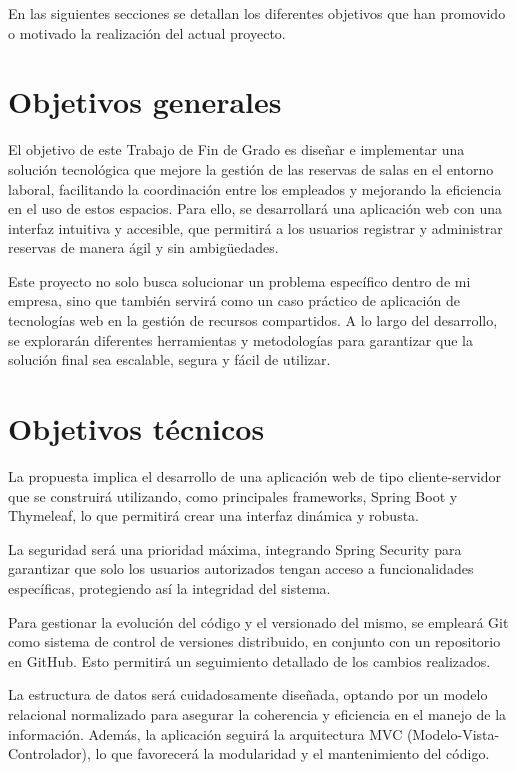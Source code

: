 
En las siguientes secciones se detallan los diferentes objetivos que han promovido o motivado la realización del actual proyecto.

\section{Objetivos generales}\label{objetivos-generales}
El objetivo de este Trabajo de Fin de Grado es diseñar e implementar una solución tecnológica que mejore la gestión de las reservas de salas en el entorno laboral, facilitando la coordinación entre los empleados y mejorando la eficiencia en el uso de estos espacios. Para ello, se desarrollará una aplicación web con una interfaz intuitiva y accesible, que permitirá a los usuarios registrar y administrar reservas de manera ágil y sin ambigüedades.

Este proyecto no solo busca solucionar un problema específico dentro de mi empresa, sino que también servirá como un caso práctico de aplicación de tecnologías web en la gestión de recursos compartidos. A lo largo del desarrollo, se explorarán diferentes herramientas y metodologías para garantizar que la solución final sea escalable, segura y fácil de utilizar.

\section{Objetivos técnicos}\label{objetivos-tecnicos}
La propuesta implica el desarrollo de una aplicación web de tipo cliente-servidor que se construirá utilizando, como principales frameworks, Spring Boot y Thymeleaf, lo que permitirá crear una interfaz dinámica y robusta.

La seguridad será una prioridad máxima, integrando Spring Security para garantizar que solo los usuarios autorizados tengan acceso a funcionalidades específicas, protegiendo así la integridad del sistema.

Para gestionar la evolución del código y el versionado del mismo, se empleará Git como sistema de control de versiones distribuido, en conjunto con un repositorio en GitHub. Esto permitirá un seguimiento detallado de los cambios realizados.

La estructura de datos será cuidadosamente diseñada, optando por un modelo relacional normalizado para asegurar la coherencia y eficiencia en el manejo de la información. Además, la aplicación seguirá la arquitectura MVC (Modelo-Vista-Controlador), lo que favorecerá la modularidad y el mantenimiento del código.

